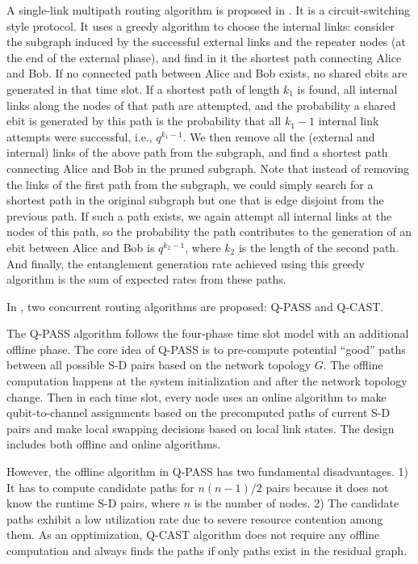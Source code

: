 \documentclass[10pt]{article}
\begin{document}
A single-link
multipath routing algorithm is proposed in \cite{pant2019routing}. It is a circuit-switching style protocol. It uses a greedy algorithm to choose the internal links: consider the subgraph induced by the successful external links and the repeater nodes (at the end of the external phase), and find in it the shortest path connecting Alice and Bob.
If no connected path between Alice and Bob exists, no shared ebits are generated in that time slot. If a shortest path of length $k_1$ is found, all internal links along the nodes of that path are attempted, and the probability a shared ebit is generated by this path is the probability that all $k_1−1$ internal link attempts were successful, i.e., $q^{k_1−1}$.
We then remove all the (external and internal) links of the above path from the subgraph, and find a shortest path connecting Alice and Bob in the pruned subgraph. Note that instead of removing the links of the first path from the subgraph, we could simply search for a shortest path in the original subgraph but one that is edge disjoint from the previous path. If such a path exists, we again attempt all internal links at the nodes of this path, so the probability the path contributes to the generation of an ebit between Alice and Bob is $q^{k_2−1}$, where $k_2$ is the length of the second path. And finally, the entanglement generation rate achieved using this greedy algorithm is the sum of expected rates from these paths.

In \cite{shi2020concurrent}, two concurrent routing algorithms are proposed: Q-PASS and Q-CAST.

The Q-PASS algorithm follows the four-phase time slot model with an additional offline phase. The core idea of Q-PASS is to pre-compute potential
``good'' paths between all possible S-D pairs based on the network topology $G$. 
The offline computation happens at the system initialization and
after the network topology change. Then in each time slot, every node uses an online algorithm to make qubit-to-channel assignments based on the precomputed paths of current S-D pairs and make local swapping decisions based on local link states. The design includes both offline and online algorithms.

However, the offline algorithm in Q-PASS has two fundamental disadvantages. 1) It has to compute candidate paths for $n(n-1)/2$ pairs because it does not know the runtime S-D pairs, where $n$ is the number of nodes. 2) The candidate paths exhibit a low utilization rate due to severe resource contention among them. As an opptimization, Q-CAST algorithm does not require any offline computation and always finds the paths if only paths exist in the residual graph.
\end{document}
